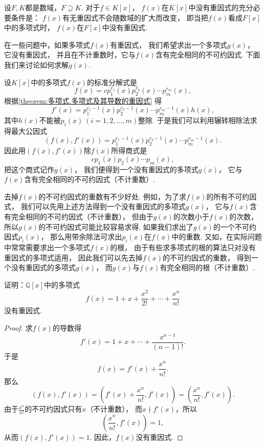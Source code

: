\begin{proposition}
设\(F,K\)都是数域，\(F \supseteq K\).
对于\(f \in K[x]\)，
\(f(x)\)在\(K[x]\)中没有重因式的充分必要条件是：
\(f(x)\)有无重因式不会随数域的扩大而改变，
即当把\(f(x)\)看成\(F[x]\)中的多项式时，
\(f(x)\)在\(F[x]\)中没有重因式.
\end{proposition}

在一些问题中，如果多项式\(f(x)\)有重因式，
我们希望求出一个多项式\(g(x)\)，
它没有重因式，
并且在不计重数时，它与\(f(x)\)含有完全相同的不可约因式.
下面我们来讨论如何求解\(g(x)\).

设\(K[x]\)中的多项式\(f(x)\)的标准分解式是\[
	f(x) = c p_1^{r_1}(x) p_2^{r_2}(x) \dotsm p_m^{r_m}(x),
\]
根据\cref{theorem:多项式.多项式及其导数的重因式} 得\[
	f'(x) = p_1^{r_1-1}(x) p_2^{r_2-1}(x) \dotsm p_m^{r_m-1}(x) h(x),
\]
其中\(h(x)\)不能被\(p_i(x)\ (i=1,2,\dotsc,m)\)整除.
于是我们可以利用辗转相除法求得最大公因式\[
	(f(x),f'(x))
	= p_1^{r_1-1}(x) p_2^{r_2-1}(x) \dotsm p_m^{r_m-1}(x).
\]
因此用\((f(x),f'(x))\)除\(f(x)\)所得商式是\[
	c p_1(x) p_2(x) \dotsm p_m(x),
\]
把这个商式记作\(g(x)\)，
我们便得到一个没有重因式的多项式\(g(x)\)，
它与\(f(x)\)含有完全相同的不可约因式（不计重数）.

去掉\(f(x)\)的不可约因式的重数有不少好处.
例如，为了求\(f(x)\)的所有不可约因式，
我们可以先用上述方法得到一个没有重因式的多项式\(g(x)\)，
它与\(f(x)\)含有完全相同的不可约因式（不计重数），
但由于\(g(x)\)的次数小于\(f(x)\)的次数，
所以\(g(x)\)的不可约因式可能比较容易求得.
如果我们求出了\(g(x)\)的一个不可约因式\(p_i(x)\)，
那么用带余除法可求出\(p_i(x)\)在\(f(x)\)中的重数.
又如，在实际问题中常常需要求出一个多项式\(f(x)\)的根，
由于有些求多项式的根的算法只对没有重因式的多项式适用，
因此我们可以先去掉\(f(x)\)的不可约因式的重数，
得到一个没有重因式的多项式\(g(x)\)，
而\(g(x)\)与\(f(x)\)有完全相同的根（不计重数）.

\begin{example}
证明：\(\mathbb{Q}[x]\)中的多项式\[
	f(x) = 1+x+\frac{x^2}{2!}+\dotsb+\frac{x^n}{n!}
\]没有重因式.
\begin{proof}
求\(f(x)\)的导数得\[
	f'(x) = 1+x+\dotsm+\frac{x^{n-1}}{(n-1)!}.
\]
于是\[
	f(x) = f'(x) + \frac{x^n}{n!}.
\]
那么\[
	(f(x),f'(x))
	= \left(
		f'(x)+\frac{x^n}{n!},
		f'(x)
	\right)
	= \left(
		\frac{x^n}{n!},
		f'(x)
	\right).
\]
由于\(\frac{x^n}{n!}\)的不可约因式只有\(x\)（不计重数），
而\(x \nmid f'(x)\)，所以\[
	\left(
		\frac{x^n}{n!},
		f'(x)
	\right)
	= 1,
\]
从而\((f(x),f'(x))=1\).
因此，\(f(x)\)没有重因式.
\end{proof}
\end{example}

